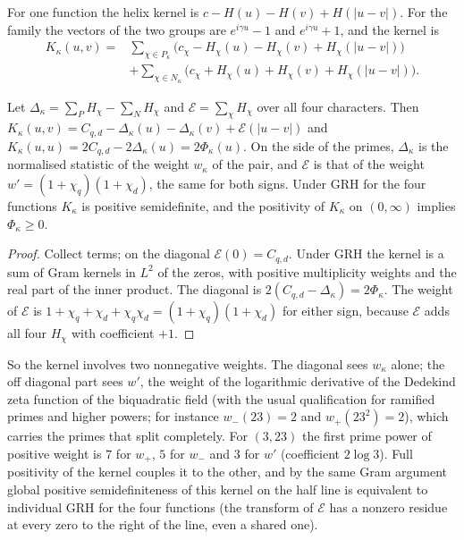 For one function the helix kernel is $c-H(u)-H(v)+H(|u-v|)$. For the family the vectors of the two groups are $e^{i\gamma u}-1$ and $e^{i\gamma u}+1$, and the kernel is
\[
\begin{aligned}K_\kappa(u,v)={}&\sum_{\chi\in P_\kappa}\bigl(c_\chi-H_\chi(u)-H_\chi(v)+H_\chi(|u-v|)\bigr)\\&+\sum_{\chi\in N_\kappa}\bigl(c_\chi+H_\chi(u)+H_\chi(v)+H_\chi(|u-v|)\bigr).\end{aligned}
\]

\begin{proposition}\label{mqf:prop:kernel}
Let $\Delta_\kappa=\sum_PH_\chi-\sum_NH_\chi$ and $\mathcal E=\sum_\chi H_\chi$ over all four characters. Then $K_\kappa(u,v)=C_{q,d}-\Delta_\kappa(u)-\Delta_\kappa(v)+\mathcal E(|u-v|)$ and $K_\kappa(u,u)=2C_{q,d}-2\Delta_\kappa(u)=2\Phi_\kappa(u)$. On the side of the primes, $\Delta_\kappa$ is the normalised statistic of the weight $w_\kappa$ of the pair, and $\mathcal E$ is that of the weight $w'=(1+\chi_q)(1+\chi_d)$, the same for both signs. Under GRH for the four functions $K_\kappa$ is positive semidefinite, and the positivity of $K_\kappa$ on $(0,\infty)$ implies $\Phi_\kappa\ge0$.
\end{proposition}

\begin{proof}
Collect terms; on the diagonal $\mathcal E(0)=C_{q,d}$. Under GRH the kernel is a sum of Gram kernels in $L^2$ of the zeros, with positive multiplicity weights and the real part of the inner product. The diagonal is $2(C_{q,d}-\Delta_\kappa)=2\Phi_\kappa$. The weight of $\mathcal E$ is $1+\chi_q+\chi_d+\chi_q\chi_d=(1+\chi_q)(1+\chi_d)$ for either sign, because $\mathcal E$ adds all four $H_\chi$ with coefficient $+1$.
\end{proof}

So the kernel involves two nonnegative weights. The diagonal sees $w_\kappa$ alone; the off diagonal part sees $w'$, the weight of the logarithmic derivative of the Dedekind zeta function of the biquadratic field (with the usual qualification for ramified primes and higher powers; for instance $w_-(23)=2$ and $w_+(23^2)=2$), which carries the primes that split completely. For $(3,23)$ the first prime power of positive weight is $7$ for $w_+$, $5$ for $w_-$ and $3$ for $w'$ (coefficient $2\log3$). Full positivity of the kernel couples it to the other, and by the same Gram argument global positive semidefiniteness of this kernel on the half line is equivalent to individual GRH for the four functions (the transform of $\mathcal E$ has a nonzero residue at every zero to the right of the line, even a shared one).

